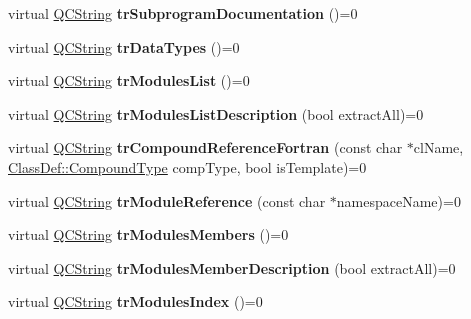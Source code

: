 \begin{DoxyCompactItemize}
\mbox{\label{class_translator_a66fabf8785f82dbb59804f67dc4aae84}} 
virtual \mbox{\hyperlink{class_q_c_string}{Q\+C\+String}} {\bfseries tr\+Subprogram\+Documentation} ()=0
\item 
\mbox{\label{class_translator_a0a0157cfc45d1bc085438bf1d3cca3bb}} 
virtual \mbox{\hyperlink{class_q_c_string}{Q\+C\+String}} {\bfseries tr\+Data\+Types} ()=0
\item 
\mbox{\label{class_translator_a307b9ec047c97330b93adcdebb43a548}} 
virtual \mbox{\hyperlink{class_q_c_string}{Q\+C\+String}} {\bfseries tr\+Modules\+List} ()=0
\item 
\mbox{\label{class_translator_a5273ea86727c6460eae628782d416669}} 
virtual \mbox{\hyperlink{class_q_c_string}{Q\+C\+String}} {\bfseries tr\+Modules\+List\+Description} (bool extract\+All)=0
\item 
\mbox{\label{class_translator_abff334a66edc039b1e8257ab27739744}} 
virtual \mbox{\hyperlink{class_q_c_string}{Q\+C\+String}} {\bfseries tr\+Compound\+Reference\+Fortran} (const char $\ast$cl\+Name, \mbox{\hyperlink{class_class_def_ae70cf86d35fe954a94c566fbcfc87939}{Class\+Def\+::\+Compound\+Type}} comp\+Type, bool is\+Template)=0
\item 
\mbox{\label{class_translator_a112174f615836178aec4c9dcb29469be}} 
virtual \mbox{\hyperlink{class_q_c_string}{Q\+C\+String}} {\bfseries tr\+Module\+Reference} (const char $\ast$namespace\+Name)=0
\item 
\mbox{\label{class_translator_a73e62152bb05ffe75997806daf5e0b8d}} 
virtual \mbox{\hyperlink{class_q_c_string}{Q\+C\+String}} {\bfseries tr\+Modules\+Members} ()=0
\item 
\mbox{\label{class_translator_a7702dae5014c8f51767c12eb540d34e0}} 
virtual \mbox{\hyperlink{class_q_c_string}{Q\+C\+String}} {\bfseries tr\+Modules\+Member\+Description} (bool extract\+All)=0
\item 
\mbox{\label{class_translator_aaa71718cc9cdcceea109f72ab6c23b44}} 
virtual \mbox{\hyperlink{class_q_c_string}{Q\+C\+String}} {\bfseries tr\+Modules\+Index} ()=0

\end{DoxyCompactItemize}
